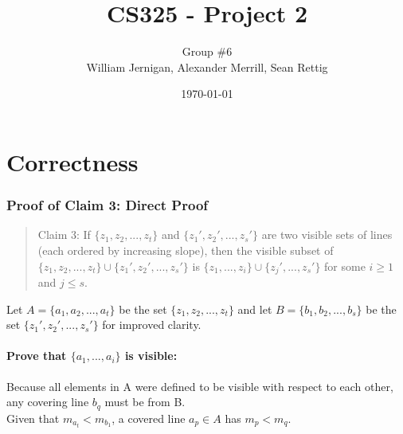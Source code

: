\documentclass{article}
\title{CS325 - Project 2}
\author{Group \#6 \\ William Jernigan, Alexander Merrill, Sean Rettig}
\date{\today}
\begin{document}
\maketitle

\part*{Correctness}
\section*{Proof of Claim 3: Direct Proof}

\begin{quote}
Claim 3: If $\{z_{1},z_{2},...,z_{t}\}$ and $\{z_{1}',z_{2}',...,z_{s}'\}$ are two visible sets of lines (each ordered by increasing slope), then the visible subset of $\{z_{1},z_{2},...,z_{t}\}\cup\{z_{1}',z_{2}',...,z_{s}'\}$ is $\{z_{1},...,z_{i}\}\cup\{z_{j}',...,z_{s}'\}$ for some $i \geq 1$ and $j \leq s$.
\end{quote}
Let $A = \{a_{1},a_{2},...,a_{t}\}$ be the set $\{z_{1},z_{2},...,z_{t}\}$ and let $B = \{b_{1},b_{2},...,b_{s}\}$ be the set $\{z_{1}',z_{2}',...,z_{s}'\}$ for improved clarity.

\subsection*{Prove that $\{a_{1},...,a_{i}\}$ is visible:}
    Because all elements in A were defined to be visible with respect to each other, any covering line $b_{q}$ must be from B.\\
    Given that $m_{a_{t}} < m_{b_{1}}$, a covered line $a_{p} \in A$ has $m_{p} < m_{q}$.
    
\end{document}
